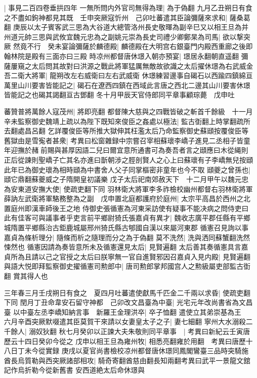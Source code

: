 |{
	事見二百四卷垂拱四年}
一無所問内外官司無得為理|{
	為于偽翻}
九月乙丑朔日有食之不盡如鉤神都見其既　壬申突厥寇忻州　己卯吐蕃遣其臣論彌薩來求和|{
	薩桑葛翻}
庚辰以太子賓客武三思為大谷道大總管洛州長史敬暉為副辛巳又以相王旦為并州道元帥三思與武攸宜魏元忠為之副姚元崇為長史司禮少卿鄭杲為司馬|{
	欲以撃突厥}
然竟不行　癸未宴論彌薩於麟德殿|{
	麟德殿在大明宫右銀臺門内殿西重廊之後即翰林院是殿有三面亦曰三殿}
時凉州都督唐休璟入朝亦預宴|{
	璟居永翻朝直遥翻}
彌薩屢窺之太后問其故對曰洪源之戰此將軍猛厲無敵故欲識之太后擢休璟為右武威金吾二衛大將軍|{
	龍朔改左右威衛曰左右武威衛}
休璟練習邊事自碣石以西踰四鎮綿亘萬里山川要害皆能記之|{
	碣石在遼西四鎮在西域此言唐之西北二邊其山川要害休璟皆能記之也碣其謁翻亘古鄧翻}
冬十月甲辰天官侍郎同平章事顧琮薨　戊申吐

蕃贊普將萬餘人寇茂州|{
	將即亮翻}
都督陳大慈與之四戰皆破之斬首千餘級　十一月辛未監察御史魏靖上疏以為陛下既知來俊臣之姦處以極法|{
	監古衘翻上時掌翻疏所去翻處昌呂翻}
乞詳覆俊臣等所推大獄伸其枉濫太后乃命監察御史蘇頲按覆俊臣等舊獄由是雪寃者甚衆|{
	考異曰松窗雜録中宗嘗召宰相蘇瓌李嶠子進見二丞相子皆童年迎撫於赭前賜與甚厚因語二兒曰爾宜意所通書可為奏吾者言之頲應曰木從䋲則正后從諫則聖嶠子亡其名亦進曰斮朝涉之脛剖賢人之心上曰蘇瓌有子李嶠無兒按頲此年已為御史瓌為相時頲為中書舍人父子同掌樞密非童年也今不取}
頲夔之曾孫也|{
	頲它鼎翻蘇夔威之子隋開皇初議樂}
戊子太后祀南郊赦天下　十二月甲午以魏元忠為安東道安撫大使|{
	使疏吏翻下同}
羽林衛大將軍李多祚檢校幽州都督右羽林衛將軍薛訥左武衛將軍駱務整為之副　戊申置北庭都護府於庭州|{
	太宗平高昌於西州之北置庭州即漢車師後王之地}
侍御史張循憲為河東采訪使有疑事不能决病之問侍吏曰此有佳客可與議事者乎吏言前平鄉尉猗氏張嘉貞有異才|{
	魏收志廣平郡任縣有平鄉城隋置平鄉縣治古鉅鹿城屬邢州猗氏縣古郇國自漢以來屬河東郡}
循憲召見詢以事嘉貞為條析理分|{
	隨條而析之隨理而分之為于偽翻}
莫不洗然|{
	洗與洒同蘇蟹翻洗然悚然也}
循憲因請為奏皆意所未及循憲還見太后|{
	見賢遍翻}
太后善其奏循憲具言嘉貞所為且請以己之官授之太后曰朕寧無一官自進賢邪因召嘉貞入見内殿|{
	見賢遍翻}
與語大悦即拜監察御史擢循憲司勲郎中|{
	唐司勲郎掌邦國宫人之勲級屬吏部監古衘翻}
賞其得人也

三年春三月壬戌朔日有食之　夏四月吐蕃遣使獻馬千匹金二千兩以求昏|{
	使疏吏翻下同}
閏月丁丑命韋安石留守神都　己卯改文昌臺為中臺|{
	光宅元年改尚書省為文昌臺}
以中臺左丞李嶠知納言事　新羅王金理洪卒|{
	卒子恤翻}
遣使立其弟崇基為王　六月辛酉突厥默啜遣其臣莫賀干來請以女妻皇太子之子|{
	妻七細翻}
寧州大水溺殺二千餘人|{
	溺奴狄翻}
秋七月癸卯以正諫大夫朱敬則同平章事　|{
	考異曰新紀云壬寅唐歷云十四日癸卯今從之}
戊申以相王旦為雍州牧|{
	相悉亮翻雍於用翻　考異曰唐歷十八日丁未今從實録}
庚戌以夏官尚書檢校凉州都督唐休璟同鳳閣鸞臺三品時突騎施酋長烏質勒與西突厥諸部相攻|{
	騎奇寄翻酋慈由翻長知兩翻考異曰武平一景龍文舘記作烏折勒今從新舊書}
安西道絶太后命休璟與

